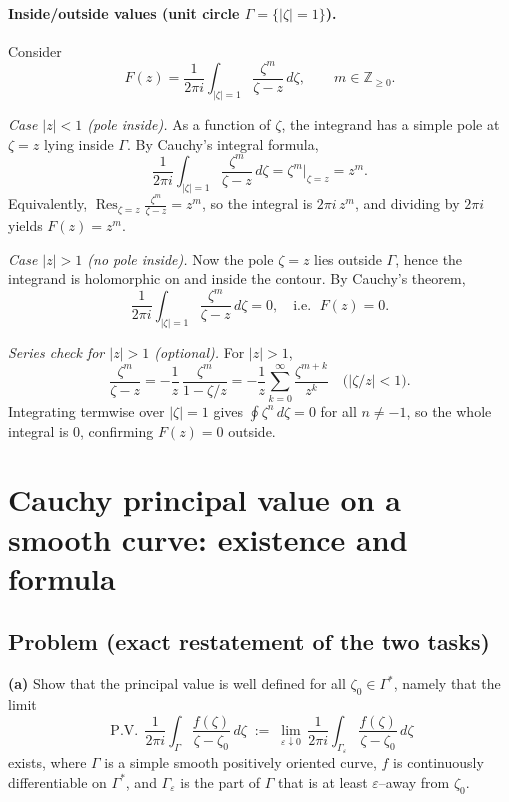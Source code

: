 \documentclass[11pt]{article}
\begin{document}
\paragraph{Inside/outside values (unit circle \(\Gamma=\{|\zeta|=1\}\)).}
Consider
\[
F(z)=\frac{1}{2\pi i}\int_{|\zeta|=1}\frac{\zeta^{m}}{\zeta-z}\,d\zeta,
\qquad m\in\mathbb{Z}_{\ge 0}.
\]

\emph{Case \(|z|<1\) (pole inside).}
As a function of \(\zeta\), the integrand has a simple pole at \(\zeta=z\) lying inside \(\Gamma\).
By Cauchy’s integral formula,
\[
\frac{1}{2\pi i}\int_{|\zeta|=1}\frac{\zeta^{m}}{\zeta-z}\,d\zeta
=\zeta^{m}\big|_{\zeta=z}
=z^{m}.
\]
Equivalently, \(\operatorname{Res}_{\zeta=z}\frac{\zeta^{m}}{\zeta-z}=z^{m}\), so the integral is \(2\pi i\,z^{m}\), and dividing by \(2\pi i\) yields \(F(z)=z^{m}\).

\medskip

\emph{Case \(|z|>1\) (no pole inside).}
Now the pole \(\zeta=z\) lies outside \(\Gamma\), hence the integrand is holomorphic on and inside the contour.
By Cauchy’s theorem,
\[
\frac{1}{2\pi i}\int_{|\zeta|=1}\frac{\zeta^{m}}{\zeta-z}\,d\zeta=0,
\quad\text{i.e. }\; F(z)=0.
\]

\medskip

\emph{Series check for \(|z|>1\) (optional).}
For \(|z|>1\),
\[
\frac{\zeta^{m}}{\zeta-z}
=-\frac{1}{z}\,\frac{\zeta^{m}}{1-\zeta/z}
=-\frac{1}{z}\sum_{k=0}^{\infty}\frac{\zeta^{m+k}}{z^{k}}
\quad\big(|\zeta/z|<1\big).
\]
Integrating termwise over \(|\zeta|=1\) gives \(\displaystyle \oint \zeta^{n}\,d\zeta=0\) for all \(n\neq -1\),
so the whole integral is \(0\), confirming \(F(z)=0\) outside.
	
	
	\section*{Cauchy principal value on a smooth curve: existence and formula}
	
	\subsection*{Problem (exact restatement of the two tasks)}
	
	\noindent\textbf{(a)} Show that the principal value is well defined for all $\zeta_{0}\in\Gamma^{\ast}$, namely that the limit
	\[
	\operatorname{P.V.}\,\frac{1}{2\pi i}\int_{\Gamma}\frac{f(\zeta)}{\zeta-\zeta_{0}}\,d\zeta
	\;:=\;\lim_{\varepsilon\downarrow 0}\,\frac{1}{2\pi i}\int_{\Gamma_{\varepsilon}}
	\frac{f(\zeta)}{\zeta-\zeta_{0}}\,d\zeta
	\]
	exists, where $\Gamma$ is a simple smooth positively oriented curve, $f$ is continuously differentiable on $\Gamma^{\ast}$, and $\Gamma_{\varepsilon}$ is the part of $\Gamma$ that is at least $\varepsilon$–away from $\zeta_{0}$.
	
\end{document}
